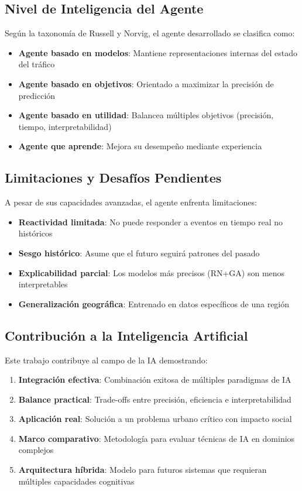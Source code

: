 \documentclass{svproc} %
\begin{document}
\subsection{Nivel de Inteligencia del Agente}

Según la taxonomía de Russell y Norvig, el agente desarrollado se clasifica como:

\begin{itemize}
    \item \textbf{Agente basado en modelos}: Mantiene representaciones internas del estado del tráfico
    \item \textbf{Agente basado en objetivos}: Orientado a maximizar la precisión de predicción
    \item \textbf{Agente basado en utilidad}: Balancea múltiples objetivos (precisión, tiempo, interpretabilidad)
    \item \textbf{Agente que aprende}: Mejora su desempeño mediante experiencia
\end{itemize}

\subsection{Limitaciones y Desafíos Pendientes}

A pesar de sus capacidades avanzadas, el agente enfrenta limitaciones:

\begin{itemize}
    \item \textbf{Reactividad limitada}: No puede responder a eventos en tiempo real no históricos
    \item \textbf{Sesgo histórico}: Asume que el futuro seguirá patrones del pasado
    \item \textbf{Explicabilidad parcial}: Los modelos más precisos (RN+GA) son menos interpretables
    \item \textbf{Generalización geográfica}: Entrenado en datos específicos de una región
\end{itemize}

\subsection{Contribución a la Inteligencia Artificial}
Este trabajo contribuye al campo de la IA demostrando:

\begin{enumerate}
    \item \textbf{Integración efectiva}: Combinación exitosa de múltiples paradigmas de IA
    \item \textbf{Balance practical}: Trade-offs entre precisión, eficiencia e interpretabilidad
    \item \textbf{Aplicación real}: Solución a un problema urbano crítico con impacto social
    \item \textbf{Marco comparativo}: Metodología para evaluar técnicas de IA en dominios complejos
    \item \textbf{Arquitectura híbrida}: Modelo para futuros sistemas que requieran múltiples capacidades cognitivas
\end{enumerate}
\end{document}
